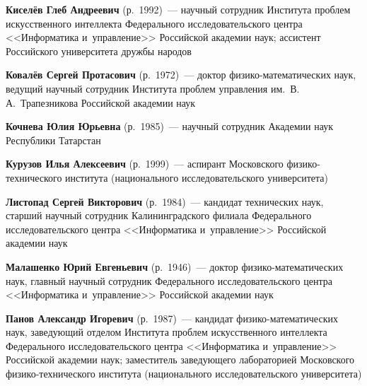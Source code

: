 \begin{multicols}{2}
 \vspace*{3pt}
 
 
\noindent
\textbf{Киселёв Глеб Андреевич} (р.\ 1992)~--- 
научный сотрудник Института проб\-лем искусственного интеллекта Федерального исследовательского цент\-ра 
<<Информатика и~управ\-ле\-ние>> Российской академии наук; ассистент Российского университета друж\-бы на\-родов



\vspace*{3pt}


\noindent
\textbf{Ковалёв Сергей Протасович} (р.\ 1972)~--- доктор фи\-зи\-ко-ма\-те\-ма\-ти\-че\-ских наук, 
ведущий научный со\-труд\-ник Института проб\-лем управления им.\ В.\,А.~Трапезникова 
Российской академии наук

\vspace*{3pt}

\noindent
\textbf{Кочнева Юлия Юрьевна} (р.\ 1985)~--- научный сотрудник Академии наук Республики Татарстан

\vspace*{3pt}

\noindent
\textbf{Курузов Илья Алексеевич} (р.\ 1999)~--- аспирант Московского фи\-зи\-ко-тех\-ни\-че\-ско\-го 
института (национального исследовательского университета)

\vspace*{3pt}

\noindent
\textbf{Листопад Сергей Викторович} (р.\ 1984)~--- 
кандидат технических наук, старший научный сотрудник Калининградского филиала Федерального 
исследовательского цент\-ра <<Информатика и~управ\-ле\-ние>> Российской академии наук

\vspace*{3pt}

\noindent
\textbf{Малашенко Юрий Евгеньевич} (р.\ 1946)~--- доктор 
фи\-зи\-ко-ма\-те\-ма\-ти\-че\-ских наук, главный научный со\-труд\-ник 
Федерального исследовательского цент\-ра <<Информатика и~управ\-ле\-ние>> Российской академии наук

\vspace*{3pt}

\noindent
\textbf{Панов Александр Игоревич} (р.\ 1987)~--- кандидат 
фи\-зи\-ко-ма\-те\-ма\-ти\-че\-ских наук, за\-ве\-ду\-ющий отделом Института проб\-лем 
искусственного интеллекта Федерального исследовательского цент\-ра 
<<Информатика и~управ\-ле\-ние>> Российской академии наук; заместитель 
за\-ве\-ду\-юще\-го лабораторией Московского фи\-зи\-ко-тех\-ни\-че\-ско\-го 
института (национального исследовательского университета)


\end{multicols}
